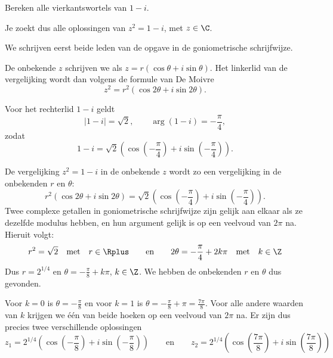 \documentclass{ximera}
\begin{document}
\begin{example} Bereken alle vierkantswortels van $1-i$.
    \begin{hint}
    Je zoekt dus alle oplossingen van $z^2 = 1 - i$, met $z \in \C$.
    \end{hint}
    \begin{oplossing}
        We schrijven eerst beide leden van de opgave in de goniometrische schrijfwijze.
         
        De onbekende $z$ schrijven we als $z = r(\cos\theta+i\sin\theta)$. Het linkerlid van de vergelijking wordt dan volgens de formule van De Moivre $$z^2 = r^2 (\cos 2\theta+i\sin 2\theta).$$
         
        Voor het rechterlid $1-i$ geldt
        \[ |1-i| = \sqrt{2}, \qquad \arg (1-i) = - \frac{\pi}{4}, \]
        zodat
        \[ 1-i = \sqrt{2}( \cos(-\frac{\pi}{4}) + i \sin(-\frac{\pi}{4})). \]
         
        De
        vergelijking $z^2 = 1-i$ in de onbekende $z$ wordt zo een vergelijking in de onbekenden $r$ en $\theta$:
        $$r^2 (\cos 2\theta+i\sin 2\theta) = \sqrt{2} ( \cos(-\frac{\pi}{4}) + i \sin(-\frac{\pi}{4})).$$
        Twee complexe getallen in goniometrische schrijfwijze zijn gelijk aan elkaar als ze dezelfde modulus hebben, en hun argument gelijk is op een veelvoud van $2 \pi$ na.
        Hieruit volgt:
        \[ r^2 = \sqrt{2} \quad \text{met} \quad r\in \Rplus \qquad \text{en} \qquad 2 \theta = - \frac{\pi}{4} + 2 k \pi \quad \text{met} \quad k\in \Z\]
        Dus $r= 2^{1/4}$ en $\theta = - \frac{\pi}{8} + k \pi$, $k \in \Z$. We hebben de onbekenden $r$ en $\theta$ dus gevonden.
         
         Voor $k=0$ is
        $\theta = - \frac{\pi}{8}$ en voor $k=1$ is $\theta = -
        \frac{\pi}{8} + \pi = \frac{7\pi}{8}$. Voor alle andere waarden van $k$ krijgen we één van beide hoeken op een veelvoud van $2 \pi$ na. 
        Er zijn dus precies twee verschillende oplossingen
        \[ 
            z_1 = 2^{1/4}\left( \cos\left(-\frac{\pi}{8}\right) + i \sin\left(-\frac{\pi}{8}\right)\right)  \qquad \text{en} \qquad
            z_2 = 2^{1/4}\left( \cos\left(\frac{7\pi}{8}\right) + i \sin\left(\frac{7\pi}{8}\right)\right)  
        \]
         
    \end{oplossing}
\end{example}
 
\end{document}
